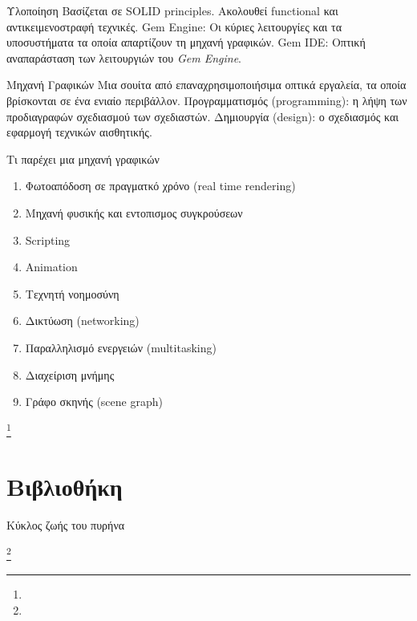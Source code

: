 \documentclass{beamer}
\newcommand\blfootnote[1]{%
	\begingroup
	\renewcommand\thefootnote{}\footnote{#1}%
	\addtocounter{footnote}{-1}%
	\endgroup
}
\begin{document}
	\begin{frame}{Υλοποίηση}
			Βασίζεται σε SOLID principles. 
			\newline
			Ακολουθεί functional και αντικειμενοστραφή τεχνικές.
			\newline 
			\newline
			\alert{Gem Engine:} Οι κύριες λειτουργίες και τα υποσυστήματα τα οποία απαρτίζουν τη μηχανή γραφικών.
			\newline
			\alert{Gem IDE:} Οπτική αναπαράσταση των λειτουργιών του \textit{Gem Engine}.
	\end{frame}			
		
	\begin{frame}{Mηχανή Γραφικών}		
		Mια σουίτα από επαναχρησιμοποιήσιμα οπτικά εργαλεία, τα οποία βρίσκονται σε ένα ενιαίο περιβάλλον. 
		\newline
		\newline
		\alert{Προγραμματισμός (programming)}: η λήψη των προδιαγραφών σχεδιασμού των σχεδιαστών.
		\newline
		\alert{Δημιουργία (design)}: ο σχεδιασμός και εφαρμογή τεχνικών αισθητικής.		
	\end{frame}
	
	\begin{frame}{Τι παρέχει μια μηχανή γραφικών}		
	\begin{enumerate}
		\item Φωτοαπόδοση σε πραγματκό χρόνο (real time rendering)
		\item Mηχανή φυσικής και εντοπισμος συγκρούσεων
		\item Scripting
		\item Animation
		\item Τεχνητή νοημοσύνη
		\item Δικτύωση (networking)
		\item Παραλληλισμό ενεργειών (multitasking)
		\item Διαχείριση μνήμης
		\item Γράφο σκηνής (scene graph)
	\end{enumerate}
	\blfootnote{}
	\end{frame}
		
	\section{Bιβλιοθήκη}
		
	\begin{frame}{Κύκλος ζωής του πυρήνα}
		\begin{figure}
			\centering
			\resizebox{4.8cm}{!}{}
		\end{figure}
		\blfootnote{}	
	\end{frame}
\end{document}
